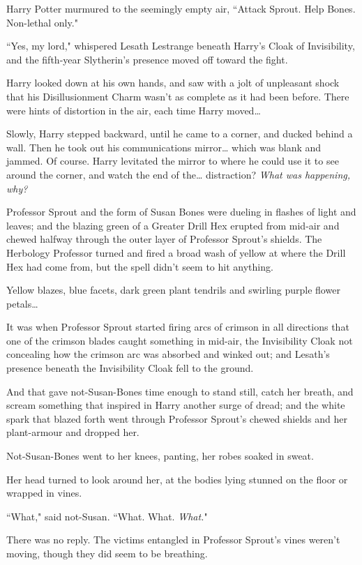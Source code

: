 Harry Potter murmured to the seemingly empty air, ``Attack Sprout. Help Bones. Non-lethal only."

``Yes, my lord," whispered Lesath Lestrange beneath Harry's Cloak of Invisibility, and the fifth-year Slytherin's presence moved off toward the fight.

Harry looked down at his own hands, and saw with a jolt of unpleasant shock that his Disillusionment Charm wasn't as complete as it had been before. There were hints of distortion in the air, each time Harry moved{\ldots}

Slowly, Harry stepped backward, until he came to a corner, and ducked behind a wall. Then he took out his communications mirror{\ldots} which was blank and jammed. Of course. Harry levitated the mirror to where he could use it to see around the corner, and watch the end of the{\ldots} distraction? \emph{What was happening, why?}

Professor Sprout and the form of Susan Bones were dueling in flashes of light and leaves; and the blazing green of a Greater Drill Hex erupted from mid-air and chewed halfway through the outer layer of Professor Sprout's shields. The Herbology Professor turned and fired a broad wash of yellow at where the Drill Hex had come from, but the spell didn't seem to hit anything.

Yellow blazes, blue facets, dark green plant tendrils and swirling purple flower petals{\ldots}

It was when Professor Sprout started firing arcs of crimson in all directions that one of the crimson blades caught something in mid-air, the Invisibility Cloak not concealing how the crimson arc was absorbed and winked out; and Lesath's presence beneath the Invisibility Cloak fell to the ground.

And that gave not-Susan-Bones time enough to stand still, catch her breath, and scream something that inspired in Harry another surge of dread; and the white spark that blazed forth went through Professor Sprout's chewed shields and her plant-armour and dropped her.

Not-Susan-Bones went to her knees, panting, her robes soaked in sweat.

Her head turned to look around her, at the bodies lying stunned on the floor or wrapped in vines.

``What," said not-Susan. ``What. What. \emph{What.}"

There was no reply. The victims entangled in Professor Sprout's vines weren't moving, though they did seem to be breathing.


